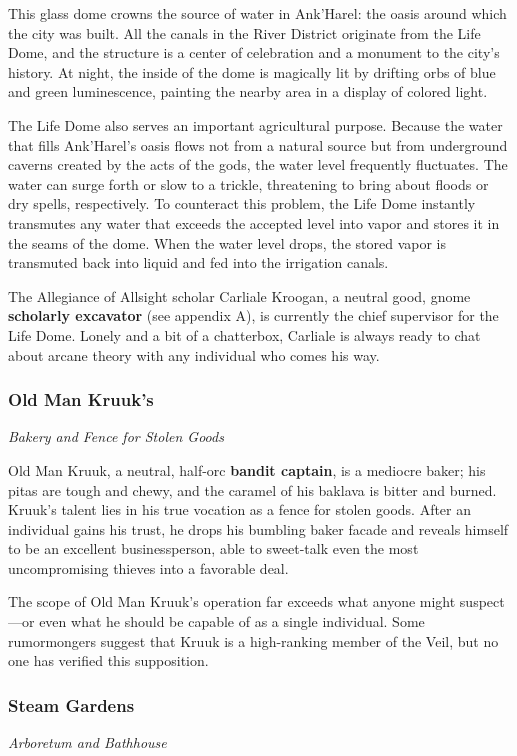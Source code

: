 \documentclass[10pt,a4paper,twoside,fancy,bg=print,twocolumn,openany,nodeprecatedcode]{dndbook}
\begin{document}
This glass dome crowns the source of water in Ank'Harel: the oasis around which the city was built. All the canals in the River District originate from the Life Dome, and the structure is a center of celebration and a monument to the city's history. At night, the inside of the dome is magically lit by drifting orbs of blue and green luminescence, painting the nearby area in a display of colored light.

The Life Dome also serves an important agricultural purpose. Because the water that fills Ank'Harel's oasis flows not from a natural source but from underground caverns created by the acts of the gods, the water level frequently fluctuates. The water can surge forth or slow to a trickle, threatening to bring about floods or dry spells, respectively. To counteract this problem, the Life Dome instantly transmutes any water that exceeds the accepted level into vapor and stores it in the seams of the dome. When the water level drops, the stored vapor is transmuted back into liquid and fed into the irrigation canals.

The Allegiance of Allsight scholar Carliale Kroogan, a neutral good, gnome \textbf{scholarly excavator} (see appendix A), is currently the chief supervisor for the Life Dome. Lonely and a bit of a chatterbox, Carliale is always ready to chat about arcane theory with any individual who comes his way.

\subsubsection{Old Man Kruuk's}
\textit{Bakery and Fence for Stolen Goods}

Old Man Kruuk, a neutral, half-orc \textbf{bandit captain}, is a mediocre baker; his pitas are tough and chewy, and the caramel of his baklava is bitter and burned. Kruuk's talent lies in his true vocation as a fence for stolen goods. After an individual gains his trust, he drops his bumbling baker facade and reveals himself to be an excellent businessperson, able to sweet-talk even the most uncompromising thieves into a favorable deal.

The scope of Old Man Kruuk's operation far exceeds what anyone might suspect—or even what he should be capable of as a single individual. Some rumormongers suggest that Kruuk is a high-ranking member of the Veil, but no one has verified this supposition.

\subsubsection{Steam Gardens}
\textit{Arboretum and Bathhouse}
\end{document}

